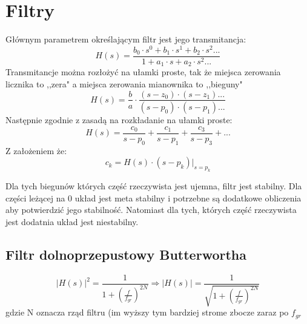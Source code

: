 \section{Filtry}
    Głównym parametrem określającym filtr jest jego transmitancja:
    \begin{equation*}
        H(s) = \frac{b_0\cdot s^0+b_1\cdot s^1+ b_2\cdot s^2...}{1+a_1\cdot s + a_2\cdot s^2...}
    \end{equation*}
    Transmitancje można rozłożyć na ułamki proste, tak że miejsca zerowania licznika to ,,zera" a miejsca zerowania mianownika to ,,bieguny"
    \begin{equation*}
        H(s) = \frac{b}{a}\cdot \frac{(s-z_0)\cdot(s-z_1)...}{(s-p_0)\cdot(s-p_1)...}
    \end{equation*}
    Następnie zgodnie z zasadą na rozkładanie na ułamki proste:
    \begin{equation*}
        H(s) = \frac{c_0}{s-p_0}+\frac{c_1}{s-p_1}+\frac{c_3}{s-p_3}+...
    \end{equation*}
    Z założeniem że:
    \begin{equation*}
        c_k = H(s)\cdot(s-p_k)\vert _{s = p_k}
    \end{equation*}

    Dla tych biegunów których część rzeczywista jest ujemna, filtr jest stabilny.
    Dla części leżącej na 0 układ jest meta stabilny i potrzebne są dodatkowe obliczenia aby potwierdzić jego stabilność.
    Natomiast dla tych, których część rzeczywista jest dodatnia układ jest niestabilny.


    \subsection{Filtr dolnoprzepustowy Butterwortha}
        \begin{equation*}
            |H(s)|^2 = \frac{1}{1+\left(\frac{f}{f_{gr}}\right)^{2N}} \Rightarrow |H(s)| = \frac{1}{\sqrt{1+\left(\frac{f}{f_{gr}}\right)^{2N}}}
        \end{equation*}
        gdzie N oznacza rząd filtru (im wyższy tym bardziej strome zbocze zaraz po $f_{gr}$

